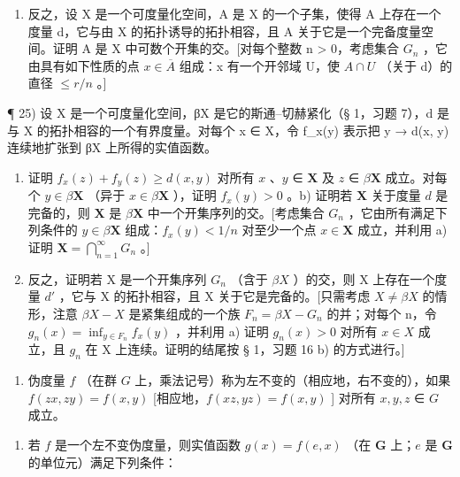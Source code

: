 \begin{enumerate}
\def\labelenumi{\alph{enumi})}
\setcounter{enumi}{1}
\tightlist
\item
  反之，设 X 是一个可度量化空间，A 是 X 的一个子集，使得 A 上存在一个度量 d，它与由 X 的拓扑诱导的拓扑相容，且 A 关于它是一个完备度量空间。证明 A 是 X 中可数个开集的交。{[}对每个整数 n \textgreater{} 0，考虑集合 \(G_{n}\) ，它由具有如下性质的点 \(x \in \overline{A}\) 组成：x 有一个开邻域 U，使 \(A \cap U\) （关于 d）的直径 \(\leqslant r/n\) 。{]}
\end{enumerate}

¶ 25) 设 X 是一个可度量化空间，βX 是它的斯通–切赫紧化（§ 1，习题 7），d 是与 X 的拓扑相容的一个有界度量。对每个 x ∈ X，令 f\_x(y) 表示把 y → d(x, y) 连续地扩张到 βX 上所得的实值函数。

\begin{enumerate}
\def\labelenumi{\alph{enumi})}
\item
  证明 \(f_{x}(z) + f_{y}(z) \geqslant d(x, y)\) 对所有 \(x\) 、\(y\) ∈ \(\mathbf{X}\) 及 \(z\) ∈ \(\beta \mathbf{X}\) 成立。对每个 \(y \in \beta \mathbf{X}\) （异于 \(x \in \beta \mathbf{X}\) ），证明 \(f_{x}(y) > 0\) 。b) 证明若 \(\mathbf{X}\) 关于度量 \(d\) 是完备的，则 \(\mathbf{X}\) 是 \(\beta \mathbf{X}\) 中一个开集序列的交。{[}考虑集合 \(G_{n}\) ，它由所有满足下列条件的 \(y \in \beta \mathbf{X}\) 组成：\(f_{x}(y) < 1 / n\) 对至少一个点 \(x \in \mathbf{X}\) 成立，并利用 a) 证明 \(\mathbf{X} = \bigcap_{n=1}^{\infty} G_{n}\) 。{]}
\item
  反之，证明若 X 是一个开集序列 \(G_{n}\) （含于 \(\beta X\) ）的交，则 X 上存在一个度量 \(d'\) ，它与 X 的拓扑相容，且 X 关于它是完备的。{[}只需考虑 \(X \neq \beta X\) 的情形，注意 \(\beta X - X\) 是紧集组成的一个族 \(F_{n} = \beta X - G_{n}\) 的并；对每个 n，令 \(g_{n}(x) = \inf_{y \in F_{n}} f_{x}(y)\) ，并利用 a) 证明 \(g_{n}(x) > 0\) 对所有 \(x \in X\) 成立，且 \(g_{n}\) 在 X 上连续。证明的结尾按 § 1，习题 16 b) 的方式进行。{]}
\end{enumerate}

\ExerciseSection

\begin{enumerate}
\def\labelenumi{\arabic{enumi})}
\tightlist
\item
  伪度量 \(f\) （在群 \(G\) 上，乘法记号）称为左不变的（相应地，右不变的），如果 \(f(zx, zy) = f(x, y)\) {[}相应地，\(f(xz, yz) = f(x, y)\) {]} 对所有 \(x, y, z\) ∈ \(G\) 成立。
\end{enumerate}

\begin{enumerate}
\def\labelenumi{\alph{enumi})}
\tightlist
\item
  若 \(f\) 是一个左不变伪度量，则实值函数 \(g(x) = f(e, x)\) （在 \(\mathbf{G}\) 上；\(e\) 是 \(\mathbf{G}\) 的单位元）满足下列条件：
\end{enumerate}

